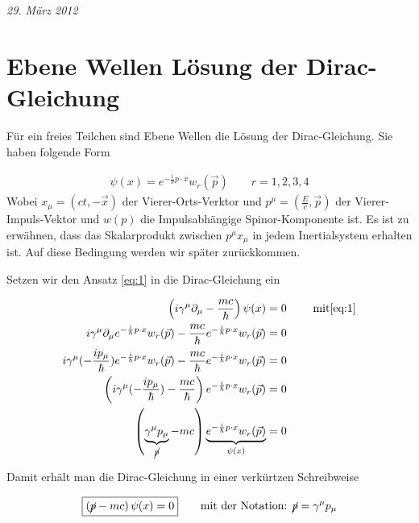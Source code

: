 
\usepackage{amsmath} 





\textit{29. März 2012}


\section*{Ebene Wellen Lösung der Dirac-Gleichung}

Für ein freies Teilchen sind Ebene Wellen die Lösung der Dirac-Gleichung. Sie haben folgende Form

\begin{align}
  \label{eq:1}
  \psi(x) = e^{-\frac{i}{\hbar}p\cdot x}w_r(\vec p) \qquad r=1,2,3,4
 \end{align}
Wobei \(x_\mu=(ct,-\vec x)\) der Vierer-Orts-Verktor und \(p^{\mu}=(\frac{E}{c},\vec p)\) der Vierer-Impuls-Vektor und \(w(p)\) die Impulsabhängige Spinor-Komponente ist.  Es ist zu erwähnen, dass das Skalarprodukt zwischen \(p^\mu x_\mu\) in jedem Inertialsystem erhalten ist. Auf diese Bedingung werden wir später zurückkommen.


Setzen wir den Ansatz \eqref{eq:1} in die Dirac-Gleichung ein

\begin{align}
  \label{eq:3}
  \left(i \gamma^\mu \partial_\mu-\frac{mc}{\hbar}  \right)\psi(x) &= 0 \qquad\text{ mit} \eqref{eq:1}   \notag \\
 i \gamma^\mu \partial_\mu  e^{-\frac{i}{\hbar}p\cdot x}w_r(\vec p) -\frac{mc}{\hbar} e^{-\frac{i}{\hbar}p\cdot x}w_r(\vec p)  &= 0  \notag \\
 i \gamma^\mu (-\frac{ip_\mu}{\hbar}) e^{-\frac{i}{\hbar}p\cdot x}w_r(\vec p) -\frac{mc}{\hbar} e^{-\frac{i}{\hbar}p\cdot x}w_r(\vec p)  &= 0  \notag \\
 \left(i \gamma^\mu (-\frac{ip_\mu}{\hbar}) -\frac{mc}{\hbar}\right) e^{-\frac{i}{\hbar}p\cdot x}w_r(\vec p)  &= 0  \notag \\
 \left(\underbr{ \gamma^\mu p_\mu}_{\cancel p} - mc\right)\underbr{ e^{-\frac{i}{\hbar}p\cdot x}w_r(\vec p)}_{\psi(x)}  &= 0 
\end{align}

Damit erhält man die Dirac-Gleichung in einer verkürtzen Schreibweise

\begin{align}
  \label{eq:4}
 \boxed{ \left(\cancel p - mc\right)\psi(x) = 0 }\qquad \text{mit der Notation: }\cancel p = \gamma^\mu p_\mu
\end{align}


